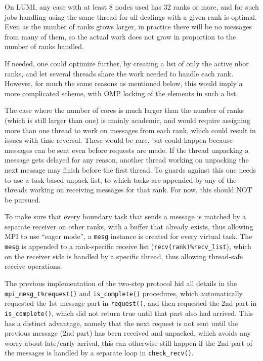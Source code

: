 \documentclass[paper=a4,fontsize=11pt]{scrartcl}
\numberwithin{equation}{section}		%
\numberwithin{figure}{section}			%
\numberwithin{table}{section}				%
\newcommand{\codecolor}{\color{Blue}}
\newcommand{\Code}[1]{{\codecolor\texttt{#1}}}
\begin{document}
On LUMI, any case with at least 8 nodes used has 32 ranks or more, and for such jobs handling using the same thread for all dealings with a given rank is optimal.  Even as the number of ranks grows larger, in practice there will be no messages from many of them, so the actual work does not grow in proportion to the number of ranks handled.

If needed, one could optimize further, by creating a list of only the active nbor ranks, and let several threads share the work needed to handle each rank.  However, for much the same reasons as mentioned below, this would imply a more complicated scheme, with OMP locking of the elements in such a list.

The case where the number of cores is much larger than the number of ranks (which is still larger than one) is mainly academic, and would require assigning more than one thread to work on messages from each rank, which could result in issues with time reversal.  These would be rare, but could happen because messages can be sent even before requests are made.  If the thread unpacking a message gets delayed for any reason, another thread working on unpacking the next message may finish before the first thread.  To guards against this one needs to use a task-based unpack list, to which tasks are appended by any of the threads working on receiving messages for that rank.  For now, this should NOT be pursued.

To make sure that every boundary task that sends a message is matched by a separate receiver on other ranks, with a buffer that already exists, thus allowing MPI to use ``eager mode'', a \Code{mesg} instance is created for every virtual task.  The \Code{mesg} is appended to a rank-specific receive list (\Code{recv(rank)\%recv\_list}), which on the receiver side is handled by a specific thread, thus allowing thread-safe receive operations.

The previous implementation of the two-step protocol hid all details in the \Code{mpi\_mesg\_t\%request()} and \Code{is\_complete()} procedures, which automatically requested the 1st message part in \Code{request()}, and then requested the 2nd part in \Code{is\_complete()}, which did not return true until that part also had arrived.  This has a distinct advantage, namely that the next request is not sent until the previous message (2nd part) has been received and unpacked, which avoids any worry about late/early arrival, this can otherwise still happen if the 2nd part of the messages is handled by a separate loop in \Code{check\_recv()}.
\end{document}

